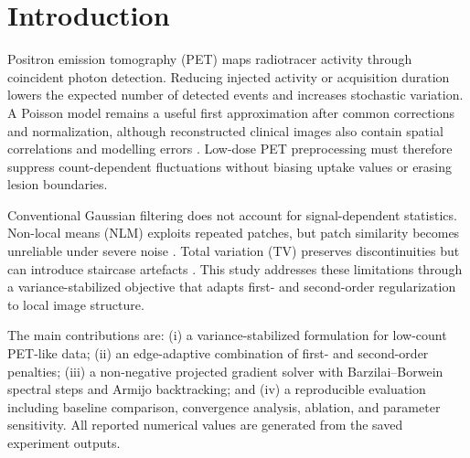 \section{Introduction}
Positron emission tomography (PET) maps radiotracer activity through coincident photon detection. Reducing injected activity or acquisition duration lowers the expected number of detected events and increases stochastic variation. A Poisson model remains a useful first approximation after common corrections and normalization, although reconstructed clinical images also contain spatial correlations and modelling errors \citep{shepp1982maximum,qi2006iterative}. Low-dose PET preprocessing must therefore suppress count-dependent fluctuations without biasing uptake values or erasing lesion boundaries.

Conventional Gaussian filtering does not account for signal-dependent statistics. Non-local means (NLM) exploits repeated patches, but patch similarity becomes unreliable under severe noise \citep{buades2005nonlocal}. Total variation (TV) preserves discontinuities but can introduce staircase artefacts \citep{rudin1992nonlinear}. This study addresses these limitations through a variance-stabilized objective that adapts first- and second-order regularization to local image structure.

The main contributions are: (i) a variance-stabilized formulation for low-count PET-like data; (ii) an edge-adaptive combination of first- and second-order penalties; (iii) a non-negative projected gradient solver with Barzilai--Borwein spectral steps and Armijo backtracking; and (iv) a reproducible evaluation including baseline comparison, convergence analysis, ablation, and parameter sensitivity. All reported numerical values are generated from the saved experiment outputs.
